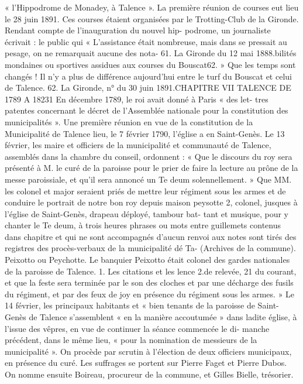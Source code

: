 \documentclass[a4paper,11pt]{book}
\begin{document}
« l'Hippodrome de Monadey, à Talence ».
La première réunion de courses eut lieu le 28 juin 1891.
Ces courses étaient organisées par le Trotting-Club de la
Gironde. Rendant compte de l'inauguration du nouvel hip-
podrome, un journaliste écrivait :
le public qui
« L'assistance était nombreuse, mais dans
se pressait au pesage, on ne remarquait aucune des nota-
61. La Gironde du 12 mai 1888.bilités mondaines ou sportives assidues aux courses du
Bouscat62. »
Que les temps sont changés ! Il n'y a plus de différence
aujourd'hui entre le turf du Bouscat et celui de Talence.
62. La Gironde, n° du 30 juin 1891.CHAPITRE VII
TALENCE DE 1789 A 18231
En décembre 1789, le roi avait donné à Paris « des let-
tres patentes concernant le décret de l'Assemblée nationale
pour la constitution des municipalités
».
Une première réunion
en vue de la constitution de la
Municipalité de Talence lieu, le 7 février 1790,
l'église
a
en
Saint-Genès.
Le 13 février, les maire et officiers de la municipalité
et communauté de Talence, assemblés dans la chambre du
conseil, ordonnent :
« Que le discours du roy sera présenté à M. le curé
de la paroisse
pour le prier de faire la lecture au prône
de la messe paroissiale,
et qu'il sera annoncé un Te deum
solennellement.
» Que MM. les colonel et major seraient priés de mettre
leur régiment
sous les armes et de conduire le portrait
de notre bon
roy depuis maison peysotte 2, colonel, jusques
à l'église de Saint-Genès, drapeau déployé, tambour bat-
tant et musique,
pour y chanter le Te deum, à trois heures
phrases ou mots entre guillemets contenus
dans
chapitre et qui ne sont accompagnés d'aucun renvoi aux notes
sont tirés des registres
des procès-verbaux de la municipalité dé Ta-
(Archives de la commune).
Peixotto ou Peychotte. Le banquier Peixotto était colonel des
gardes nationales de la paroisse de Talence.
1. Les citations et les
lence
2.de relevée, 21 du courant, et que la feste sera terminée
par le son des cloches et par une décharge des fusils du
régiment, et par des feux de joy en présence du régiment
sous les armes. »
Le 14 février, les principaux habitants et « bien tenants
de la paroisse de Saint-Genès de Talence s'assemblent « en
la manière accoutumée » dans ladite église, à l'issue des
vêpres, en vue de continuer la séance commencée le di-
manche précédent, dans le même lieu, « pour la nomination
de messieurs de la municipalité ». On procède par scrutin
à l'élection de deux officiers municipaux, en présence du
curé. Les suffrages se portent sur Pierre Faget et Pierre
Dubos.
On nomme ensuite Boireau, procureur de la commune, et
Gilles Bielle, trésorier.
\end{document}
